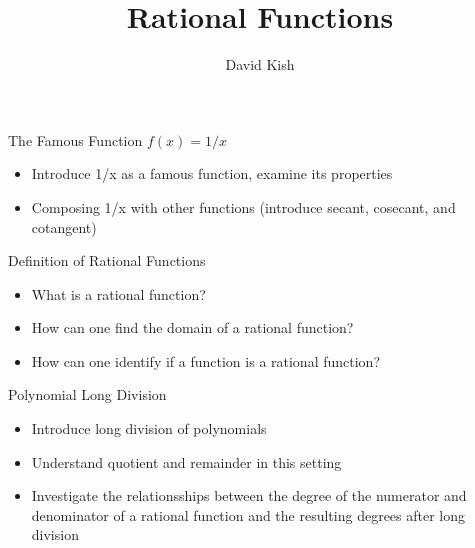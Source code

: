 \documentclass{ximera}
\author{David Kish}
\title{Rational Functions}
\begin{document}
\begin{abstract}
\end{abstract}
\maketitle


\begin{objectives}

\item The Famous Function $f(x)=1/x$
\begin{itemize}
	\item Introduce 1/x as a famous function, examine its properties 
	\item Composing 1/x with other functions (introduce secant, cosecant, and cotangent) 
\end{itemize}

\item Definition of Rational Functions
\begin{itemize}
	\item What is a rational function?
	\item How can one find the domain of a rational function? 
	\item How can one identify if a function is a rational function?
\end{itemize}

\item Polynomial Long Division
\begin{itemize}
\item Introduce long division of polynomials
\item Understand quotient and remainder in this setting
\item Investigate the relationsships between the degree of the numerator and denominator of a rational function and the resulting degrees after long division
\end{itemize}





\end{objectives}
\end{document}
